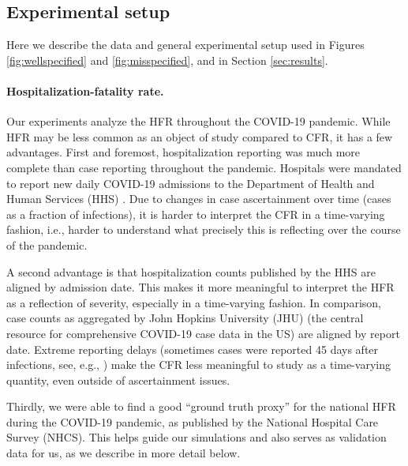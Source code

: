 \documentclass{article}
\begin{document}
\subsection{Experimental setup}
\label{sec:setup}

Here we describe the data and general experimental setup used in Figures
\ref{fig:wellspecified} and \ref{fig:misspecified}, and in Section
\ref{sec:results}.    

\paragraph{Hospitalization-fatality rate.}

Our experiments analyze the HFR throughout the COVID-19 pandemic. While HFR 
may be less common as an object of study compared to CFR, it has a few
advantages. First and foremost, hospitalization reporting was much more complete
than case reporting throughout the pandemic. Hospitals were mandated to report
new daily COVID-19 admissions to the Department of Health and Human Services
(HHS) \citep{HHS2023}. Due to changes in case ascertainment over time (cases as
a fraction of infections), it is harder to interpret the CFR in a time-varying
fashion, i.e., harder to understand what precisely this is reflecting over the
course of the pandemic.  

A second advantage is that hospitalization counts published by the HHS are
aligned by admission date. This makes it more meaningful to interpret the HFR as
a reflection of severity, especially in a time-varying fashion. In comparison,
case counts as aggregated by John Hopkins University (JHU) \citep{JHU} (the
central resource for comprehensive COVID-19 case data in the US) are aligned by
report date. Extreme reporting delays (sometimes cases were reported 45 days
after infections, see, e.g., \citealp{Jahja2022}) make the CFR less meaningful
to study as a time-varying quantity, even outside of ascertainment issues.  


Thirdly, we were able to find a good ``ground truth proxy'' for the national HFR 
during the COVID-19 pandemic, as published by the National Hospital Care Survey
(NHCS). This helps guide our simulations and also serves as validation data for
us, as we describe in more detail below.  
\end{document}
